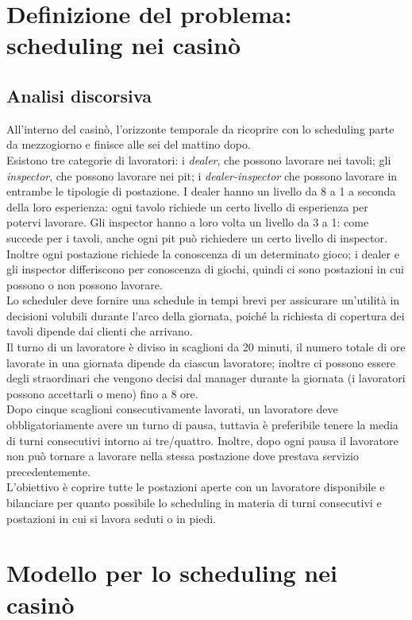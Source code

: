 \section{Definizione del problema: scheduling nei casinò}
\subsection{Analisi discorsiva}
All'interno del casinò, l'orizzonte temporale da ricoprire con lo scheduling parte da mezzogiorno e finisce alle sei del mattino dopo. \\Esistono tre categorie di lavoratori: i \textit{dealer}, che possono lavorare nei tavoli; gli \textit{inspector}, che possono lavorare nei pit; i \textit{dealer-inspector} che possono lavorare in entrambe le tipologie di postazione. I dealer hanno un livello da 8 a 1 a seconda della loro esperienza: ogni tavolo richiede un certo livello di esperienza per potervi lavorare. Gli inspector hanno a loro volta un livello da 3 a 1: come succede per i tavoli, anche ogni pit può richiedere un certo livello di inspector.
Inoltre ogni postazione richiede la conoscenza di un determinato gioco; i dealer e gli inspector differiscono per conoscenza di giochi, quindi ci sono postazioni in cui possono o non possono lavorare.\\
Lo scheduler deve fornire una schedule in tempi brevi per assicurare un'utilità in decisioni volubili durante l'arco della giornata, poiché la richiesta di copertura dei tavoli dipende dai clienti che arrivano. \\Il turno di un lavoratore è diviso in scaglioni da 20 minuti, il numero totale di ore lavorate in una giornata dipende da ciascun lavoratore; inoltre ci possono essere degli straordinari che vengono decisi dal manager durante la giornata (i lavoratori possono accettarli o meno) fino a 8 ore.\\
Dopo cinque scaglioni consecutivamente lavorati, un lavoratore deve obbligatoriamente avere un turno di pausa, tuttavia è preferibile tenere la media di turni consecutivi intorno ai tre/quattro. Inoltre, dopo ogni pausa il lavoratore non può tornare a lavorare nella stessa postazione dove prestava servizio precedentemente.\\ L'obiettivo è coprire tutte le postazioni aperte con un lavoratore disponibile e bilanciare per quanto possibile lo scheduling in materia di turni consecutivi e postazioni in cui si lavora seduti o in piedi.

\section{Modello per lo scheduling nei casinò}

